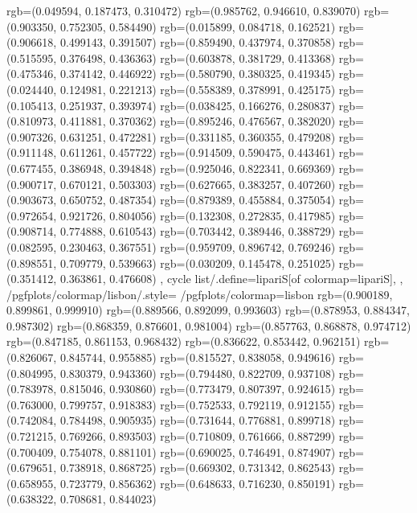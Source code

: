 {{{					rgb=(0.049594, 0.187473, 0.310472)
					rgb=(0.985762, 0.946610, 0.839070)
					rgb=(0.903350, 0.752305, 0.584490)
					rgb=(0.015899, 0.084718, 0.162521)
					rgb=(0.906618, 0.499143, 0.391507)
					rgb=(0.859490, 0.437974, 0.370858)
					rgb=(0.515595, 0.376498, 0.436363)
					rgb=(0.603878, 0.381729, 0.413368)
					rgb=(0.475346, 0.374142, 0.446922)
					rgb=(0.580790, 0.380325, 0.419345)
					rgb=(0.024440, 0.124981, 0.221213)
					rgb=(0.558389, 0.378991, 0.425175)
					rgb=(0.105413, 0.251937, 0.393974)
					rgb=(0.038425, 0.166276, 0.280837)
					rgb=(0.810973, 0.411881, 0.370362)
					rgb=(0.895246, 0.476567, 0.382020)
					rgb=(0.907326, 0.631251, 0.472281)
					rgb=(0.331185, 0.360355, 0.479208)
					rgb=(0.911148, 0.611261, 0.457722)
					rgb=(0.914509, 0.590475, 0.443461)
					rgb=(0.677455, 0.386948, 0.394848)
					rgb=(0.925046, 0.822341, 0.669369)
					rgb=(0.900717, 0.670121, 0.503303)
					rgb=(0.627665, 0.383257, 0.407260)
					rgb=(0.903673, 0.650752, 0.487354)
					rgb=(0.879389, 0.455884, 0.375054)
					rgb=(0.972654, 0.921726, 0.804056)
					rgb=(0.132308, 0.272835, 0.417985)
					rgb=(0.908714, 0.774888, 0.610543)
					rgb=(0.703442, 0.389446, 0.388729)
					rgb=(0.082595, 0.230463, 0.367551)
					rgb=(0.959709, 0.896742, 0.769246)
					rgb=(0.898551, 0.709779, 0.539663)
					rgb=(0.030209, 0.145478, 0.251025)
					rgb=(0.351412, 0.363861, 0.476608)
			},
		cycle list/.define={lipariS}{[of colormap=lipariS]},
		},
		/pgfplots/colormap/lisbon/.style={
			/pgfplots/colormap={lisbon}{%
					rgb=(0.900189, 0.899861, 0.999910)
					rgb=(0.889566, 0.892099, 0.993603)
					rgb=(0.878953, 0.884347, 0.987302)
					rgb=(0.868359, 0.876601, 0.981004)
					rgb=(0.857763, 0.868878, 0.974712)
					rgb=(0.847185, 0.861153, 0.968432)
					rgb=(0.836622, 0.853442, 0.962151)
					rgb=(0.826067, 0.845744, 0.955885)
					rgb=(0.815527, 0.838058, 0.949616)
					rgb=(0.804995, 0.830379, 0.943360)
					rgb=(0.794480, 0.822709, 0.937108)
					rgb=(0.783978, 0.815046, 0.930860)
					rgb=(0.773479, 0.807397, 0.924615)
					rgb=(0.763000, 0.799757, 0.918383)
					rgb=(0.752533, 0.792119, 0.912155)
					rgb=(0.742084, 0.784498, 0.905935)
					rgb=(0.731644, 0.776881, 0.899718)
					rgb=(0.721215, 0.769266, 0.893503)
					rgb=(0.710809, 0.761666, 0.887299)
					rgb=(0.700409, 0.754078, 0.881101)
					rgb=(0.690025, 0.746491, 0.874907)
					rgb=(0.679651, 0.738918, 0.868725)
					rgb=(0.669302, 0.731342, 0.862543)
					rgb=(0.658955, 0.723779, 0.856362)
					rgb=(0.648633, 0.716230, 0.850191)
					rgb=(0.638322, 0.708681, 0.844023)
}}}
